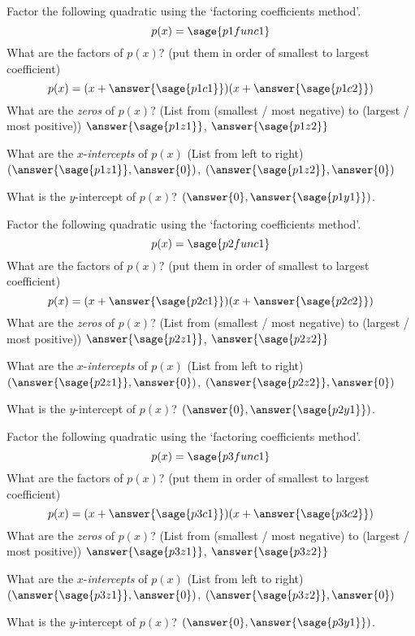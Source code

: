 \documentclass{ximera}
\begin{document}
\begin{problem}%
    Factor the following quadratic using the `factoring coefficients method'.
    \[
        p(x) = \sage{p1func1}
    \]
    What are the factors of $p(x)$? (put them in order of smallest to largest coefficient)
    \[
        p(x) = (x + \answer{\sage{p1c1}})(x + \answer{\sage{p1c2}})
    \]
    What are the \textit{zeros} of $p(x)$? (List from (smallest / most negative) to (largest / most positive)) $\answer{\sage{p1z1}}$, $\answer{\sage{p1z2}}$
    
    What are the $x$-\textit{intercepts} of $p(x)$ (List from left to right)
    $(\answer{\sage{p1z1}},\answer{0})$, $(\answer{\sage{p1z2}},\answer{0})$
    
    What is the $y$-intercept of $p(x)$?
    $(\answer{0},\answer{\sage{p1y1}})$.
\end{problem}


\begin{problem}%
    Factor the following quadratic using the `factoring coefficients method'.
    \[
        p(x) = \sage{p2func1}
    \]
    What are the factors of $p(x)$? (put them in order of smallest to largest coefficient)
    \[
        p(x) = (x + \answer{\sage{p2c1}})(x + \answer{\sage{p2c2}})
    \]
    What are the \textit{zeros} of $p(x)$? (List from (smallest / most negative) to (largest / most positive)) $\answer{\sage{p2z1}}$, $\answer{\sage{p2z2}}$
    
    What are the $x$-\textit{intercepts} of $p(x)$ (List from left to right)
    $(\answer{\sage{p2z1}},\answer{0})$, $(\answer{\sage{p2z2}},\answer{0})$
    
    What is the $y$-intercept of $p(x)$?
    $(\answer{0},\answer{\sage{p2y1}})$.
\end{problem}


\begin{problem}%
    Factor the following quadratic using the `factoring coefficients method'.
    \[
        p(x) = \sage{p3func1}
    \]
    What are the factors of $p(x)$? (put them in order of smallest to largest coefficient)
    \[
        p(x) = (x + \answer{\sage{p3c1}})(x + \answer{\sage{p3c2}})
    \]
    What are the \textit{zeros} of $p(x)$? (List from (smallest / most negative) to (largest / most positive)) $\answer{\sage{p3z1}}$, $\answer{\sage{p3z2}}$
    
    What are the $x$-\textit{intercepts} of $p(x)$ (List from left to right)
    $(\answer{\sage{p3z1}},\answer{0})$, $(\answer{\sage{p3z2}},\answer{0})$
    
    What is the $y$-intercept of $p(x)$?
    $(\answer{0},\answer{\sage{p3y1}})$.
\end{problem}
\end{document}
